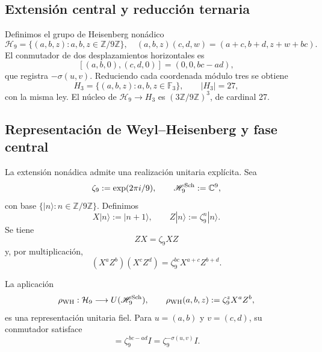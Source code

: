 \subsection{Extensión central y reducción ternaria}

Definimos el grupo de Heisenberg nonádico
\begin{equation}
 \mathcal H_9=\{(a,b,z):a,b,z\in\mathbb Z/9\mathbb Z\},
 \quad
 (a,b,z)(c,d,w)=(a+c,b+d,z+w+bc).
 \label{p12-83-c20-s6:eq:heisenberg-9-nuevo}
\end{equation}
El conmutador de dos desplazamientos horizontales es
\[
 [(a,b,0),(c,d,0)]=(0,0,bc-ad),
\]
que registra \(-\sigma(u,v)\). Reduciendo cada coordenada módulo tres se
obtiene
\begin{equation}
 H_3=\{(a,b,z):a,b,z\in\mathbb F_3\},\qquad |H_3|=27,
 \label{p12-83-c20-s6:eq:heisenberg-3-nuevo}
\end{equation}
con la misma ley. El núcleo de
\(\mathcal H_9\to H_3\) es
\((3\mathbb Z/9\mathbb Z)^3\), de cardinal 27.

\subsection{Representación de Weyl--Heisenberg y fase central}

La extensión nonádica admite una realización unitaria explícita. Sea
\[
 \zeta_9:=\exp(2\pi i/9),
 \qquad
 \mathscr H_9^{\rm Sch}:=\mathbb C^9,
\]
con base \(\{|n\rangle:n\in\mathbb Z/9\mathbb Z\}\). Definimos
\begin{equation}
 X|n\rangle:=|n+1\rangle,
 \qquad
 Z|n\rangle:=\zeta_9^n|n\rangle.
 \label{p12-83-c20-s6:eq:weyl-desplazamiento-fase-u029}
\end{equation}
Se tiene
\[
 ZX=\zeta_9XZ
\]
y, por multiplicación,
\begin{equation}
 (X^aZ^b)(X^cZ^d)
 =\zeta_9^{bc}X^{a+c}Z^{b+d}.
 \label{p12-83-c20-s6:eq:cociclo-weyl-nonadico-u029}
\end{equation}

\begin{theorem}
\label{p12-83-c20-s6:thm:representacion-weyl-heisenberg-u029}
La aplicación
\begin{equation}
 \rho_{\rm WH}:\mathcal H_9\longrightarrow
 U(\mathscr H_9^{\rm Sch}),
 \qquad
 \rho_{\rm WH}(a,b,z):=\zeta_9^zX^aZ^b,
 \label{p12-83-c20-s6:eq:representacion-weyl-heisenberg-u029}
\end{equation}
es una representación unitaria fiel. Para
\(u=(a,b)\) y \(v=(c,d)\), su conmutador satisface
\begin{equation}
 [\rho_{\rm WH}(u,0),\rho_{\rm WH}(v,0)]
 =\zeta_9^{\,bc-ad}I
 =\zeta_9^{-\sigma(u,v)}I.
 \label{p12-83-c20-s6:eq:conmutador-weyl-holonomia-u029}
\end{equation}
\end{theorem}

